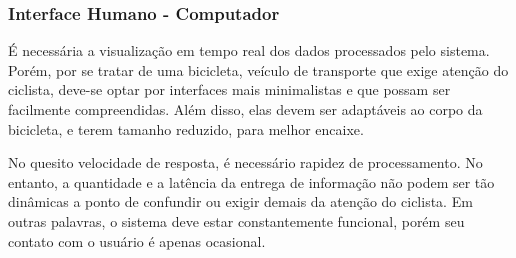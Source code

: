  		\subsubsection{Interface Humano - Computador}
 		É necessária a visualização em tempo real dos dados processados pelo sistema. Porém, por se tratar de uma bicicleta, veículo de transporte que exige atenção do ciclista, deve-se optar por interfaces mais minimalistas e que possam ser facilmente compreendidas. Além disso, elas devem ser adaptáveis ao corpo da bicicleta, e terem tamanho reduzido, para melhor encaixe.
 		
 		No quesito velocidade de resposta, é necessário rapidez de processamento. No entanto, a quantidade e a latência da entrega de informação não podem ser tão dinâmicas a ponto de confundir ou exigir demais da atenção do ciclista. Em outras palavras,  o sistema deve estar constantemente funcional, porém seu contato com o usuário é apenas ocasional.
 		
